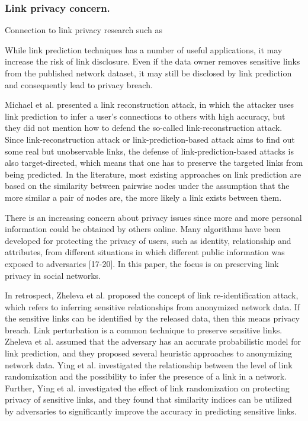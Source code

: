 \subsubsection{Link privacy concern.}

Connection to link privacy research such as \cite{amin:wwwj}

While link prediction techniques has a number of useful applications, it may increase the risk of link disclosure. Even if the data owner removes sensitive links from the published network dataset, it may still be disclosed by link prediction and consequently lead to privacy breach. 

Michael et al. \cite{fire2013links} presented a link reconstruction attack, in which the attacker uses link prediction to infer a user's connections to others with high accuracy, but they did not mention how to defend the so-called link-reconstruction attack. Since link-reconstruction attack or link-prediction-based attack aims to find out some real but unobservable links, the defense of link-prediction-based attacks is also target-directed, which means that one has to preserve the targeted links from being predicted. In the literature, most existing approaches on link prediction are based on the similarity between pairwise nodes under the assumption that the more similar a pair of nodes are, the more likely a link exists between them.

There is an increasing concern about privacy issues since more and more personal information could be obtained by others online. Many algorithms have been developed for protecting the privacy of users, such as identity, relationship and attributes, from different situations in which different public information was exposed to adversaries [17-20]. In this paper, the focus is on preserving link privacy in social networks.

In retrospect, Zheleva et al. \cite{zheleva2008preserving} proposed the concept of link re-identification attack, which refers to inferring sensitive relationships from anonymized network data. If the sensitive links can be identified by the released data, then this means privacy breach. Link perturbation is a common technique to preserve sensitive links. Zheleva et al. \cite{zheleva2008preserving} assumed that the adversary has an accurate probabilistic model for link prediction, and they proposed several heuristic approaches to anonymizing network data. Ying et al. \cite{ying2008randomizing} investigated the relationship between the level of link randomization and the possibility to infer the presence of a link in a network. Further, Ying et al. \cite{ying2009link} investigated the effect of link randomization on protecting privacy of sensitive links, and they found that similarity indices can be utilized by adversaries to significantly improve the accuracy in predicting sensitive links.

